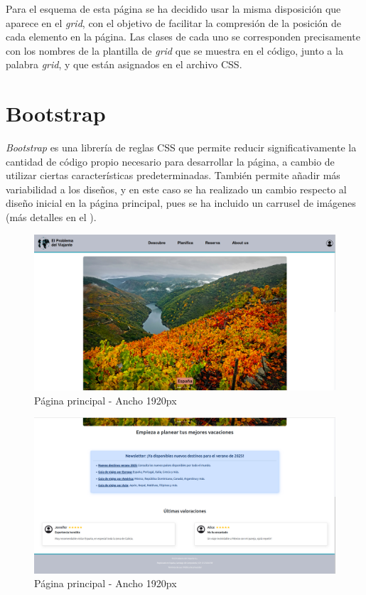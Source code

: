 \documentclass[11pt, a4paper]{book}
\begin{document}
	Para el esquema de esta página se ha decidido usar la misma disposición que aparece en el \textit{grid}, con el objetivo de facilitar la compresión de la posición de cada elemento en la página. Las clases de cada uno se corresponden precisamente con los nombres de la plantilla de \textit{grid} que se muestra en el código, junto a la palabra \textit{grid}, y que están asignados en el archivo CSS.

	
	\section{Bootstrap}
	\textit{Bootstrap} es una librería de reglas CSS que permite reducir significativamente la cantidad de código propio necesario para desarrollar la página, a cambio de utilizar ciertas características predeterminadas. También permite añadir más variabilidad a los diseños, y en este caso se ha realizado un cambio respecto al diseño inicial en la página principal, pues se ha incluido un carrusel de imágenes (más detalles en el ).
	
	\begin{figure} [H]
		\centering
		\includegraphics[width=\textwidth]{CSS/1-1 1920.png}
		\caption{Página principal - Ancho 1920px}
	\end{figure}
	\begin{figure} [H]
		\centering
		\includegraphics[width=\textwidth]{CSS/1-2 1920.png}
		\caption{Página principal - Ancho 1920px}
	\end{figure}
\end{document}
